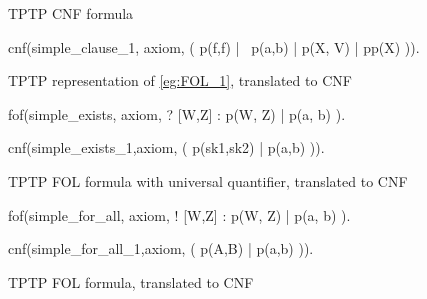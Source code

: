 \begin{listing}[H]
  \caption{TPTP CNF formula}
\begin{tptpcode}
cnf(simple_clause_1, axiom,
    ( p(f,f) | ~p(a,b) | p(X, V) | pp(X) )).

\end{tptpcode}
\end{listing}

\begin{listing}[H]
  \caption{TPTP representation of \ref{eg:FOL_1}, translated to CNF}
\begin{tptpcode}
fof(simple_exists, axiom,
 ? [W,Z] :  p(W, Z) | p(a, b)
  ).

cnf(simple_exists_1,axiom,
    ( p(sk1,sk2) | p(a,b) )).
\end{tptpcode}
\end{listing}

\begin{listing}[H]
  \caption{TPTP FOL formula with universal quantifier, translated to CNF}
\begin{tptpcode}
fof(simple_for_all, axiom,
 ! [W,Z] :  p(W, Z) | p(a, b)
  ).

cnf(simple_for_all_1,axiom,
    ( p(A,B) | p(a,b) )).
\end{tptpcode}
\end{listing}

\begin{listing}[H]
  \caption{TPTP FOL formula, translated to CNF}
\end{listing}

